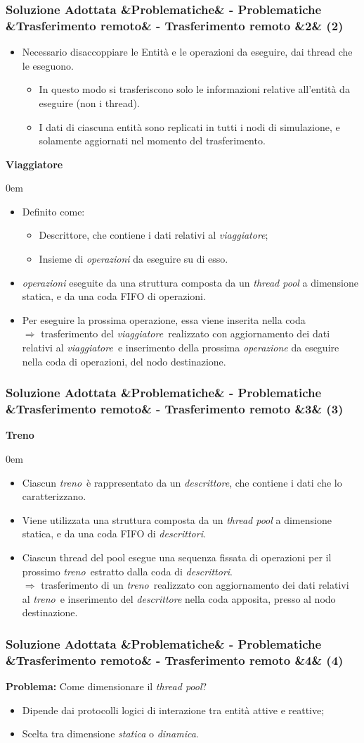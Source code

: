 \documentclass[slidestop,compress,blackandwhite]{beamer}
\newcommand{\ii}[1]{\textit{#1}}
\newcommand{\treno}{\ii{treno}}
\newcommand{\viaggiatore}{\ii{viaggiatore}}
\newcommand{\describe}[2]{
	\textbf{#1}\\
	\begin{addmargin}[2em]{0em}
		#2
	\end{addmargin}
}
\newcommand{\newtitle}[4]{
	#1 
	\ifx&#2&%
	\else
  		\large- #2
	\fi
	\ifx&#3&%
	\else
  		\normalsize- #3
	\fi
	\ifx&#4&%
	\else
  		\normalsize (#4)
	\fi
}
\newcommand{\newframe}[5]{
	\begin{frame}
		\frametitle{\newtitle{#1}{#2}{#3}{#4}}
		#5
	\end{frame}
}
\newcommand{\myitemize}[1]{\begin{itemize}#1\end{itemize}}
\begin{document}
	\newframe{Soluzione Adottata}{Problematiche}{Trasferimento remoto}{2}{
		\myitemize{
			\item Necessario disaccoppiare le Entità e le operazioni da eseguire, dai thread che le eseguono.
				\myitemize{
					\item In questo modo si trasferiscono solo le informazioni relative all'entità da eseguire (non i thread).
					\item I dati di ciascuna entità sono replicati in tutti i nodi di simulazione, e solamente aggiornati nel momento del trasferimento.	
				}
		}
		\describe{Viaggiatore}{
			\myitemize{
				\item Definito come:
					\myitemize{
						\item Descrittore, che contiene i dati relativi al \viaggiatore;
						\item Insieme di \ii{operazioni} da eseguire su di esso.
					}
				\item \ii{operazioni} eseguite da una struttura composta da un \ii{thread pool} a dimensione statica, e da una coda FIFO di operazioni.
				\item Per eseguire la prossima operazione, essa viene inserita nella coda\\
				$\Rightarrow$ trasferimento del \viaggiatore~realizzato con aggiornamento dei dati relativi al \viaggiatore~e inserimento della prossima \ii{operazione} da eseguire nella coda di operazioni, del nodo destinazione. 
			}
		}
		
		
	}
	
	\newframe{Soluzione Adottata}{Problematiche}{Trasferimento remoto}{3}{
		\describe{Treno}{
			\myitemize{
				\item Ciascun \treno~è rappresentato da un \ii{descrittore}, che contiene i dati che lo caratterizzano.
				\item Viene utilizzata una struttura composta da un \ii{thread pool} a dimensione statica, e da una coda FIFO di \ii{descrittori}.\\
				\item Ciascun thread del pool esegue una sequenza fissata di operazioni per il prossimo \treno~estratto dalla coda di \ii{descrittori}.\\
				$\Rightarrow$ trasferimento di un \treno~realizzato con aggiornamento dei dati relativi al \treno~e inserimento del \ii{descrittore} nella coda apposita, presso al nodo destinazione.
			}
		}
		
	}
	
	\newframe{Soluzione Adottata}{Problematiche}{Trasferimento remoto}{4}{
		\textbf{Problema:} Come dimensionare il \ii{thread pool}?
		\myitemize{
			\item Dipende dai protocolli logici di interazione tra entità attive e reattive;
			\item Scelta tra dimensione \ii{statica} o \ii{dinamica}.
		}
	}
	
\end{document}
